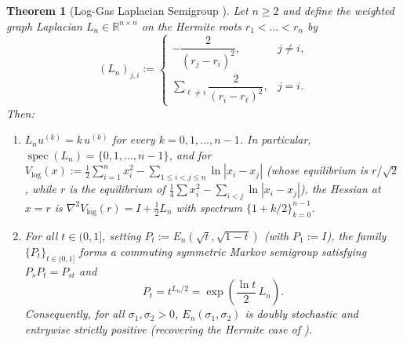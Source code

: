 \documentclass[11pt,a4paper]{article}
\newtheorem{theorem}{Theorem}[section]
\theoremstyle{definition}
\DeclareMathOperator{\spec}{spec}
\newcommand{\R}{\mathbb{R}}
\begin{document}
\begin{theorem}[Log-Gas Laplacian Semigroup {\cite[Theorem~5.1 and Appendix~A]{HH2026}}]
\label{thm:semigroup}
Let $n \ge 2$ and define the weighted graph Laplacian $L_n \in \R^{n \times n}$ on the Hermite roots $r_1 < \dots < r_n$ by
\[
(L_n)_{j,i} := \begin{cases}
-\dfrac{2}{(r_j - r_i)^2}, & j \neq i, \\[10pt]
\displaystyle\sum_{\ell \neq i} \dfrac{2}{(r_i - r_\ell)^2}, & j = i.
\end{cases}
\]
Then:
\begin{enumerate}
\item[(a)] $L_n u^{(k)} = k\, u^{(k)}$ for every $k = 0,1,\dots,n-1$. In particular, $\spec(L_n) = \{0, 1, \dots, n-1\}$, and for $V_{\log}(x) := \frac{1}{2}\sum_{i=1}^n x_i^2 - \sum_{1 \le i < j \le n} \ln|x_i - x_j|$ (whose equilibrium is $r/\sqrt{2}$, while $r$ is the equilibrium of $\frac{1}{4}\sum x_i^2 - \sum_{i<j}\ln|x_i-x_j|$), the Hessian at $x = r$ is $\nabla^2 V_{\log}(r) = I + \frac{1}{2} L_n$ with spectrum $\{1 + k/2\}_{k=0}^{n-1}$.
\item[(b)] For all $t \in (0,1]$, setting $P_t := E_n(\sqrt{t}, \sqrt{1-t})$ (with $P_1 := I$), the family $\{P_t\}_{t \in (0,1]}$ forms a commuting symmetric Markov semigroup satisfying $P_s P_t = P_{st}$ and
\[
P_t = t^{L_n/2} = \exp\!\left(\frac{\ln t}{2}\, L_n\right).
\]
Consequently, for all $\sigma_1, \sigma_2 > 0$, $E_n(\sigma_1, \sigma_2)$ is doubly stochastic and entrywise strictly positive (recovering the Hermite case of \cite[Theorem~5.1]{HH2026}).
\end{enumerate}
\end{theorem}
\end{document}

